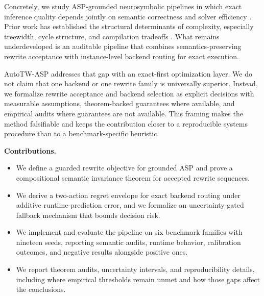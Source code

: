 \documentclass{article} %
\begin{document}
Concretely, we study ASP-grounded neurosymbolic pipelines in which exact inference quality depends jointly on semantic correctness and solver efficiency \citep{src_011,src_012,src_014,src_016,src_019,src_033,src_039,src_045}. Prior work has established the structural determinants of complexity, especially treewidth, cycle structure, and compilation tradeoffs \citep{src_001,src_002,src_003,src_006,src_008,src_045,src_046,src_047,src_048}. What remains underdeveloped is an auditable pipeline that combines semantics-preserving rewrite acceptance with instance-level backend routing for exact execution.

AutoTW-ASP addresses that gap with an exact-first optimization layer. We do not claim that one backend or one rewrite family is universally superior. Instead, we formalize rewrite acceptance and backend selection as explicit decisions with measurable assumptions, theorem-backed guarantees where available, and empirical audits where guarantees are not available. This framing makes the method falsifiable and keeps the contribution closer to a reproducible systems procedure than to a benchmark-specific heuristic.

\textbf{Contributions.}
\begin{itemize}
\item We define a guarded rewrite objective for grounded ASP and prove a compositional semantic invariance theorem for accepted rewrite sequences.
\item We derive a two-action regret envelope for exact backend routing under additive runtime-prediction error, and we formalize an uncertainty-gated fallback mechanism that bounds decision risk.
\item We implement and evaluate the pipeline on six benchmark families with nineteen seeds, reporting semantic audits, runtime behavior, calibration outcomes, and negative results alongside positive ones.
\item We report theorem audits, uncertainty intervals, and reproducibility details, including where empirical thresholds remain unmet and how those gaps affect the conclusions.
\end{itemize}
\end{document}
